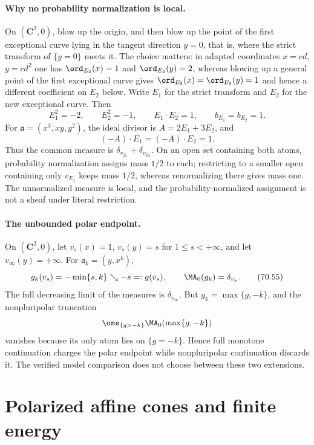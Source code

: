 \paragraph{Why no probability normalization is local.}
On \((\mathbf C^2,0)\), blow up the origin, and then blow up the point of
the first exceptional curve lying in the tangent direction \(y=0\), that is,
where the strict transform of \(\{y=0\}\) meets it.  The choice matters: in
adapted coordinates \(x=cd\), \(y=cd^2\) one has \(\ord_{E_2}(x)=1\) and
\(\ord_{E_2}(y)=2\), whereas blowing up a general point of the first
exceptional curve gives \(\ord_{E_2}(x)=\ord_{E_2}(y)=1\) and hence a
different coefficient on \(E_2\) below.  Write \(E_1\) for the strict
transform and \(E_2\) for the new exceptional curve. Then
\[
 E_1^2=-2,
 \qquad E_2^2=-1,
 \qquad E_1\cdot E_2=1,
 \qquad b_{E_1}=b_{E_2}=1.
\]
For \(\mathfrak a=(x^3,xy,y^2)\), the ideal divisor is
\(A=2E_1+3E_2\), and
\[
                      (-A)\cdot E_1=(-A)\cdot E_2=1.
\]
Thus the common measure is
\(\delta_{v_{E_1}}+\delta_{v_{E_2}}\). On an open set containing both
atoms, probability normalization assigns mass \(1/2\) to each; restricting
to a smaller open containing only \(v_{E_1}\) keeps mass \(1/2\), whereas
renormalizing there gives mass one. The unnormalized measure is local, and
the probability-normalized assignment is not a sheaf under literal
restriction.

\paragraph{The unbounded polar endpoint.}
On \((\mathbf C^2,0)\), let \(v_s(x)=1\), \(v_s(y)=s\) for
\(1\leq s<+\infty\), and let \(v_\infty(y)=+\infty\). For
\(\mathfrak a_k=(y,x^k)\),
\[
 g_k(v_s)=-\min\{s,k\}\searrow-s=:g(v_s),
 \qquad
 \MA_0(g_k)=\delta_{v_k}.
\tag{70.55}\label{eq:local-cld-polar-endpoint}
\]
The full decreasing limit of the measures is \(\delta_{v_\infty}\). But
\(g_k=\max\{g,-k\}\), and the nonpluripolar truncation
\[
 \one_{\{g>-k\}}\MA_0(\max\{g,-k\})
\]
vanishes because its only atom lies on \(\{g=-k\}\). Hence full monotone
continuation charges the polar endpoint while nonpluripolar continuation
discards it. The verified model comparison does not choose between these
two extensions.

\section{Polarized affine cones and finite energy}
\label{sec:local-polarized-affine-cones}


